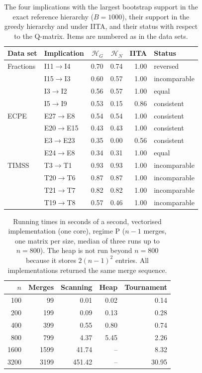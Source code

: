 \begin{table}[htbp]
	\centering
	\caption{The four implications with the largest bootstrap support in the exact reference hierarchy ($B=1000$), their support in the greedy hierarchy and under IITA, and their status with respect to the Q-matrix. Items are numbered as in the data sets.}\label{tab:realtop}
	\small
	\setlength{\tabcolsep}{4pt}
	\begin{tabular}{llrrrl}\toprule
		Data set & Implication & $\mathcal H_G$ & $\mathcal H_N$ & IITA & Status\\\midrule
		Fractions & I11$\to$I4 & 0.70 & 0.74 & 1.00 & reversed\\
		 & I15$\to$I3 & 0.60 & 0.57 & 1.00 & incomparable\\
		 & I3$\to$I2 & 0.56 & 0.57 & 1.00 & equal\\
		 & I5$\to$I9 & 0.53 & 0.15 & 0.86 & consistent\\
		\midrule
		ECPE & E27$\to$E8 & 0.54 & 0.54 & 1.00 & consistent\\
		 & E20$\to$E15 & 0.43 & 0.43 & 1.00 & consistent\\
		 & E3$\to$E23 & 0.35 & 0.00 & 0.56 & consistent\\
		 & E24$\to$E8 & 0.34 & 0.31 & 1.00 & equal\\
		\midrule
		TIMSS & T3$\to$T1 & 0.93 & 0.93 & 1.00 & incomparable\\
		 & T20$\to$T6 & 0.87 & 0.87 & 1.00 & incomparable\\
		 & T21$\to$T7 & 0.82 & 0.82 & 1.00 & incomparable\\
		 & T19$\to$T8 & 0.57 & 0.46 & 1.00 & incomparable\\
		\bottomrule
	\end{tabular}
\end{table}

\begin{table}[htbp]
	\centering
	\caption{Running times in seconds of a second, vectorised implementation (one core), regime P ($n-1$ merges, one matrix per size, median of three runs up to $n=800$). The heap is not run beyond $n=800$ because it stores $2(n-1)^2$ entries. All implementations returned the same merge sequence.}\label{tab:realscaling}
	\begin{tabular}{rrrrr}\toprule
		$n$ & Merges & Scanning & Heap & Tournament\\\midrule
		100 & 99 & 0.01 & 0.02 & 0.14\\
		200 & 199 & 0.09 & 0.13 & 0.28\\
		400 & 399 & 0.55 & 0.80 & 0.74\\
		800 & 799 & 4.37 & 5.45 & 2.26\\
		1600 & 1599 & 41.74 & -- & 8.32\\
		3200 & 3199 & 451.42 & -- & 30.95\\
		\bottomrule
	\end{tabular}
\end{table}
